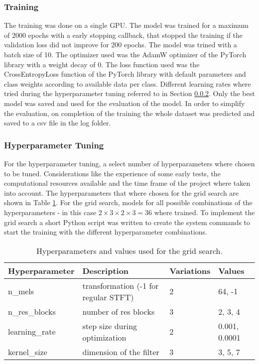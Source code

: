 \subsubsection{Training}

The training was done on a single GPU. The model was trained for a maximum of 2000 epochs
with a early stopping callback, that stopped the training if the validation loss did not improve
for 200 epochs. The model was trined with a batch size of 10. The optimizer used was the AdamW
optimizer of the PyTorch library with a weight decay of 0. The loss function used was the
CrossEntropyLoss function of the PyTorch library with default parameters and class weights
according to available data per class. Different learning rates where tried during the hyperparameter
tuning referred to in Section \ref{hyperparameter_tuning}. Only the best model was saved and used for
the evaluation of the model. In order to simplify the evaluation, on completion of the training
the whole dataset was predicted and saved to a csv file in the log folder.

\subsubsection{Hyperparameter Tuning}
\label{hyperparameter_tuning}

For the hyperparameter tuning, a select number of hyperparameters where chosen to be tuned.
Considerations like the experience of some early tests, the computational resources available
and the time frame of the project where taken into account. The hyperparameters that where
chosen for the grid search are shown in Table \ref{tab:hyperparameters}. For the grid search,
models for all possible combinations of the hyperparameters - 
in this case \( 2 \times 3 \times 2 \times 3 = 36 \) where trained. To implement the grid search a short Python
script was written to create the system commands to start the training with the different
hyperparameter combinations.
\begin{table}[h]
    \centering
    \caption{Hyperparameters and values used for the grid search.}
    \label{tab:hyperparameters}
    \begin{tabular}{|l|l|l|l|}
    \hline
    \textbf{Hyperparameter} & \textbf{Description}                  & \textbf{Variations}   & \textbf{Values} \\ \hline
    n\_mels                 & transformation (-1 for regular STFT)  & 2                     & 64, -1 \\ \hline
    n\_res\_blocks          & number of res blocks                  & 3                     & 2, 3, 4 \\ \hline
    learning\_rate          & step size during optimization         & 2                     & 0.001, 0.0001 \\ \hline
    kernel\_size            & dimension of the filter               & 3                     & 3, 5, 7 \\ \hline
    \end{tabular}

\end{table}

